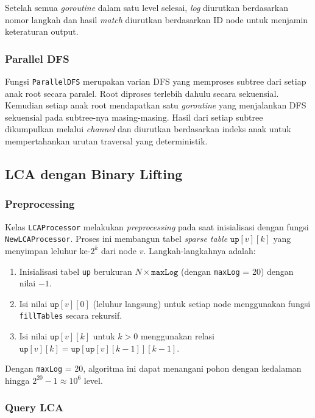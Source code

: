 Setelah semua \textit{goroutine} dalam satu level selesai, \textit{log} diurutkan berdasarkan nomor langkah dan hasil \textit{match} diurutkan berdasarkan ID node untuk menjamin keteraturan output.

\subsubsection{Parallel DFS}

Fungsi \texttt{ParallelDFS} merupakan varian DFS yang memproses subtree dari setiap anak root secara paralel. Root diproses terlebih dahulu secara sekuensial. Kemudian setiap anak root mendapatkan satu \textit{goroutine} yang menjalankan DFS sekuensial pada subtree-nya masing-masing. Hasil dari setiap subtree dikumpulkan melalui \textit{channel} dan diurutkan berdasarkan indeks anak untuk mempertahankan urutan traversal yang deterministik.

\subsection{LCA dengan Binary Lifting}

\subsubsection{Preprocessing}

Kelas \texttt{LCAProcessor} melakukan \textit{preprocessing} pada saat inisialisasi dengan fungsi \texttt{NewLCAProcessor}. Proses ini membangun tabel \textit{sparse table} $\texttt{up}[v][k]$ yang menyimpan leluhur ke-$2^k$ dari node $v$. Langkah-langkahnya adalah:

\begin{enumerate}
    \item Inisialisasi tabel \texttt{up} berukuran $N \times \texttt{maxLog}$ (dengan \texttt{maxLog} = 20) dengan nilai $-1$.
    \item Isi nilai $\texttt{up}[v][0]$ (leluhur langsung) untuk setiap node menggunakan fungsi \texttt{fillTables} secara rekursif.
    \item Isi nilai $\texttt{up}[v][k]$ untuk $k > 0$ menggunakan relasi $\texttt{up}[v][k] = \texttt{up}[\texttt{up}[v][k-1]][k-1]$.
\end{enumerate}

Dengan \texttt{maxLog} = 20, algoritma ini dapat menangani pohon dengan kedalaman hingga $2^{20} - 1 \approx 10^6$ level.

\subsubsection{Query LCA}

